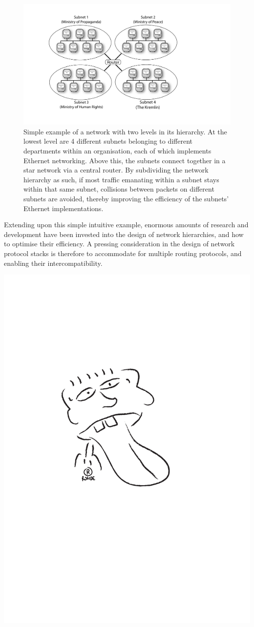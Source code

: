 \documentclass[aps, rmp, twocolumn, amsmath, amssymb, nofootinbib, superscriptaddress, longbibliography, floatfix, table-of-contents, eqsecnum]{revtex4-1}
\begin{document}
\begin{figure}[!htb]
	\includegraphics[width=\columnwidth]{network_hierarchy}
	\caption{Simple example of a network with two levels in its hierarchy. At the lowest level are 4 different subnets belonging to different departments within an organisation, each of which implements Ethernet networking. Above this, the subnets connect together in a star network via a central router. By subdividing the network hierarchy as such, if most traffic emanating within a subnet stays within that same subnet, collisions between packets on different subnets are avoided, thereby improving the efficiency of the subnets' Ethernet implementations.} \label{fig:net_hierarchy}
\end{figure}

Extending upon this simple intuitive example, enormous amounts of research and development have been invested into the design of network hierarchies, and how to optimise their efficiency. A pressing consideration in the design of network protocol stacks is therefore to accommodate for multiple routing protocols, and enabling their intercompatibility.

\begin{center}
	\includegraphics[width=0.6\columnwidth]{sketch_4}
\end{center}
\end{document}
